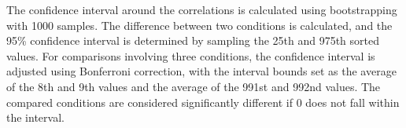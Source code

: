 The confidence interval around the correlations is calculated using bootstrapping \citep{efron1992bootstrap} with 1000 samples. The difference between two conditions is calculated, and the 95\% confidence interval is determined by sampling the 25th and 975th sorted values. For comparisons involving three conditions, the confidence interval is adjusted using Bonferroni correction, with the interval bounds set as the average of the 8th and 9th values and the average of the 991st and 992nd values. The compared conditions are considered significantly different if 0 does not fall within the interval.







